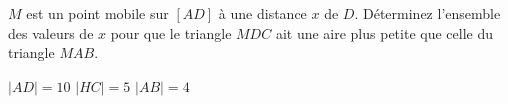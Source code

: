 %
%
    \(M\) est un point mobile sur \([AD]\) à une distance \(x\) de \(D\). Déterminez l'ensemble des valeurs de \(x\) pour que le triangle \(MDC\) ait une aire plus petite que celle du triangle \(MAB\).

    \parbox{3cm}{%
        \(\lvert AD \rvert=10\)\medbreak
        \(\lvert HC \rvert=5\)\medbreak
        \(\lvert AB \rvert=4\)%
    }
    \hfil
